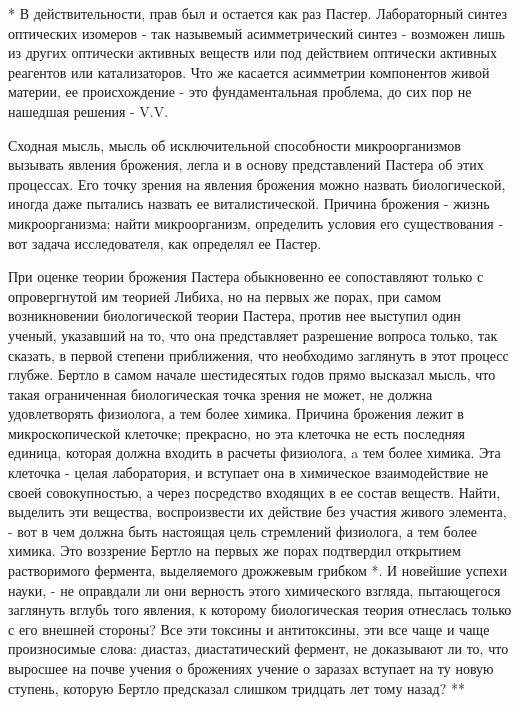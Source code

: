 * В действительности, прав был и остается как раз Пастер. Лабораторный
синтез оптических изомеров - так назывемый асимметрический синтез -
возможен лишь из других оптически активных веществ или под действием
оптически активных реагентов или катализаторов. Что же касается
асимметрии компонентов живой материи, ее происхождение - это
фундаментальная проблема, до сих пор не нашедшая решения - V.V.

Сходная  мысль,  мысль  об  исключительной  способности  микроорганизмов
вызывать явления брожения,  легла и  в основу  представлений Пастера  об
этих процессах.  Его  точку зрения  на  явления брожения  можно  назвать
биологической, иногда даже пытались назвать ее виталистической.  Причина
брожения - жизнь микроорганизма; найти микроорганизм, определить условия
его существования - вот задача исследователя, как определял ее Пастер.

При оценке теории брожения Пастера обыкновенно ее сопоставляют только  с
опровергнутой им  теорией  Либиха, но  на  первых же  порах,  при  самом
возникновении биологической  теории Пастера,  против нее  выступил  один
ученый, указавший на то, что она представляет разрешение вопроса только,
так сказать, в  первой степени приближения,  что необходимо заглянуть  в
этот процесс  глубже. Бертло  в самом  начале шестидесятых  годов  прямо
высказал мысль,  что такая  ограниченная биологическая  точка зрения  не
может, не должна  удовлетворять физиолога, а  тем более химика.  Причина
брожения лежит в микроскопической  клеточке; прекрасно, но эта  клеточка
не есть последняя единица, которая должна входить в расчеты физиолога, a
тем более химика.  Эта клеточка -  целая лаборатория, и  вступает она  в
химическое взаимодействие  не своей  совокупностью, а  через  посредство
входящих  в   ее  состав   веществ.   Найти,  выделить   эти   вещества,
воспроизвести их  действие без  участия  живого элемента,  - вот  в  чем
должна быть настоящая цель стремлений физиолога, а тем более химика. Это
воззрение Бертло на  первых же порах  подтвердил открытием  растворимого
фермента, выделяемого дрожжевым грибком *. И новейшие успехи науки, - не
оправдали  ли  они  верность  этого  химического  взгляда,   пытающегося
заглянуть вглубь того явления, к которому биологическая теория отнеслась
только с его  внешней стороны? Все  эти токсины и  антитоксины, эти  все
чаще и  чаще произносимые  слова:  диастаз, диастатический  фермент,  не
доказывают ли то,  что выросшее  на почве  учения о  брожениях учение  о
заразах вступает на ту новую ступень, которую Бертло предсказал  слишком
тридцать лет тому назад? **


